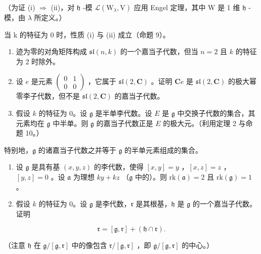 （为证 (i) \(\Longrightarrow\) (ii)，对 \(\mathfrak{h}\) -模 \(\mathcal{L}(\mathrm{W}_{\lambda},\mathrm{V})\) 应用 Engel 定理，其中 \(\mathrm{W}\) 是 1 维 \(\mathfrak{h}\) -模，由 \(\lambda\) 所定义。）

当 k 的特征为 0 时，性质 (i) 与 (ii) 成立（命题 9）。


\begin{enumerate}
\def\labelenumi{\arabic{enumi})}
\item
  迹为零的对角矩阵构成 \(\mathfrak{sl}(n,k)\) 的一个嘉当子代数，但当 \(n = 2\) 且 \(k\) 的特征为 2 时除外。
\item
  设 \(e\) 是元素 \(\begin{pmatrix} 0 & 1 \\ 0 & 0 \end{pmatrix}\) ，它属于 \(\mathfrak{sl}(2, \mathbf{C})\) 。证明 \(\mathbf{C}e\) 是 \(\mathfrak{sl}(2, \mathbf{C})\) 的极大幂零李子代数，但不是 \(\mathfrak{sl}(2, \mathbf{C})\) 的嘉当子代数。
\item
  假设 \(k\) 的特征为 0。设 \(\mathfrak{g}\) 是半单李代数。设 \(E\) 是 \(\mathfrak{g}\) 中交换子代数的集合，其元素均在 \(\mathfrak{g}\) 中半单。则 \(\mathfrak{g}\) 的嘉当子代数正是 \(E\) 的极大元。（利用定理 2 与命题 10。）
\end{enumerate}

特别地，\(\mathfrak{g}\) 的诸嘉当子代数之并等于 \(\mathfrak{g}\) 的半单元素组成的集合。

\begin{enumerate}
\def\labelenumi{\arabic{enumi})}
\setcounter{enumi}{3}
\item
  设 \(\mathfrak{g}\) 是具有基 \((x,y,z)\) 的李代数，使得 \([x,y] = y\) ，\([x,z] = z\) ，\([y,z] = 0\) 。设 \(\mathfrak{a}\) 为理想 \(ky + kz\) （\(\mathfrak{g}\) 中的）。则 \(\mathrm{rk}(\mathfrak{a}) = 2\) 且 \(\mathrm{rk}(\mathfrak{g}) = 1\) 。
\item
  假设 \(k\) 的特征为 0。设 \(\mathfrak{g}\) 是李代数，\(\mathfrak{r}\) 是其根基，\(\mathfrak{h}\) 是 \(\mathfrak{g}\) 的一个嘉当子代数。证明
\end{enumerate}

\[
\mathfrak {r} = [ \mathfrak {g}, \mathfrak {r} ] + (\mathfrak {h} \cap \mathfrak {r}).
\]

（注意 \(\mathfrak{h}\) 在 \(\mathfrak{g}/[\mathfrak{g},\mathfrak{r}]\) 中的像包含 \(\mathfrak{r}/[\mathfrak{g},\mathfrak{r}]\) ，即 \(\mathfrak{g}/[\mathfrak{g},\mathfrak{r}]\) 的中心。）

